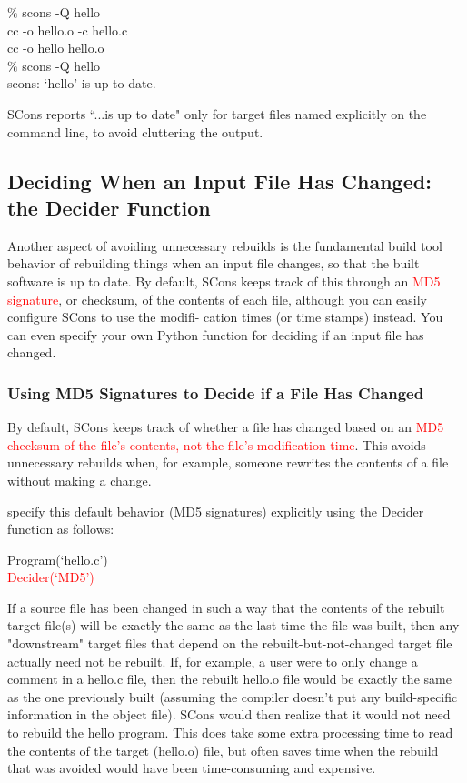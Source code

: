 \documentclass[12pt,a4paper]{article}
\begin{document}
$\%$ scons -Q hello \\
cc -o hello.o -c hello.c \\
cc -o hello hello.o \\
$\%$ scons -Q hello \\
scons: `hello' is up to date.

SCons reports ``...is up to date" only for target files named explicitly on the command line, to avoid cluttering the output.

\subsection{Deciding When an Input File Has Changed: the Decider Function}
Another aspect of avoiding unnecessary rebuilds is the fundamental build tool behavior of rebuilding things when an input file changes, so that the built software is up to date. By default, SCons keeps track of this through an \textcolor{red}{MD5 signature}, or checksum, of the contents of each file, although you can easily configure SCons to use the modifi- cation times (or time stamps) instead. You can even specify your own Python function for deciding if an input file has changed.

\subsubsection{Using MD5 Signatures to Decide if a File Has Changed}

By default, SCons keeps track of whether a file has changed based on an \textcolor{red}{MD5 checksum of the file's contents, not the file's modification time}. This avoids unnecessary rebuilds when, for example, someone rewrites the contents of a file without making a change.

specify this default behavior (MD5 signatures) explicitly using the Decider function as follows:

Program(`hello.c') \\
\textcolor{red}{Decider(`MD5')}

If a source file has been changed in such a way that the contents of the rebuilt target file(s) will be exactly the same as the last time the file was built, then any "downstream" target files that depend on the rebuilt-but-not-changed target file actually need not be rebuilt. If, for example, a user were to only change a comment in a hello.c file, then the rebuilt hello.o file would be exactly the same as the one previously built (assuming the compiler doesn't put any build-specific information in the object file). SCons would then realize that it would not need to rebuild the hello program. This does take some extra processing time to read the contents of the target (hello.o) file, but often saves time when the rebuild that was avoided would have been time-consuming and expensive.
\end{document}

